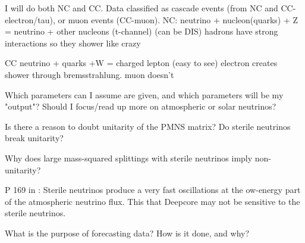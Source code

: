 \documentclass{article}
\begin{document}
I will do both NC and CC. Data classified as cascade events (from NC and CC-electron/tau), or muon events (CC-muon).
NC: neutrino + nucleon(quarks) + Z = neutrino + other nucleons (t-channel) (can be DIS)
hadrons have strong interactions so they shower like crazy


CC neutrino + quarks +W = charged lepton (easy to see)
electron creates shower through bremsstrahlung. muon doesn't


Which parameters can I assume are given, and which parameters will be my "output"?
Should I focus/read up more on atmospheric or solar neutrinos?

Is there a reason to doubt unitarity of the PMNS matrix? Do sterile neutrinos break unitarity?

Why does large mass-squared splittings with sterile neutrinos imply non-unitarity?

P 169 in \cite{heros2020}: Sterile neutrinos produce a very fast oscillations at the ow-energy part of the atmospheric neutrino flux. This that Deepcore may not be sensitive to the sterile neutrinos.

What is the purpose of forecasting data? How is it done, and why?


\end{document}
